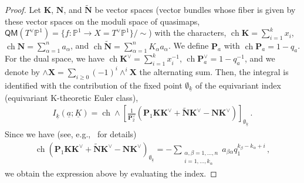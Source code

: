 \begin{proof}
    Let $\mathbf{K}$, $\mathbf{N}$, and $\widetilde{\mathbf{N}}$ be vector spaces (vector bundles whose fiber is given by these vector spaces on the moduli space of quasimaps, $\mathsf{QM}(T^\vee\mathbb{P}^1) = \{f : \mathbb{P}^1 \to X = T^\vee\mathbb{P}^1\}/\sim$) with the characters, $\operatorname{ch} \mathbf{K} = \sum_{i=1}^k x_i$, $\operatorname{ch} \mathbf{N} = \sum_{\alpha=1}^n a_\alpha$, and $\operatorname{ch} \widetilde{\mathbf{N}} = \sum_{\alpha=1}^n K_\alpha a_\alpha$.
    We define $\mathbf{P}_a$ with $\operatorname{ch} \mathbf{P}_a = 1 - q_a$.
    For the dual space, we have $\operatorname{ch} \mathbf{K}^\vee = \sum_{i=1}^k x_i^{-1}$, $\operatorname{ch} \mathbf{P}_a^\vee = 1 - q_a^{-1}$, and we denote by $\wedge \mathbf{X} = \sum_{i \ge 0} (-1)^i \wedge^i \mathbf{X}$ the alternating sum.
    Then, the integral is identified with the contribution of the fixed point $\emptyset_{\underline{k}}$ of the equivariant index (equivariant K-theoretic Euler class),
    \begin{align}
    I_{\underline{k}} (\underline{a};\underline{K}) = \operatorname{ch} \wedge \left[ \frac{1}{\mathbf{P}_2^\vee} \left( \mathbf{P}_1 \mathbf{K} \mathbf{K}^\vee + \widetilde{\mathbf{N}} \mathbf{K}^\vee - \mathbf{N} \mathbf{K}^\vee \right) \right]_{\emptyset_{\underline{k}}} \, .
    \end{align}    
    Since we have (see, e.g.,~\cite{Shadchin:2006yz} for details)
    \begin{align}
        \operatorname{ch} \left( \mathbf{P}_1 \mathbf{K} \mathbf{K}^\vee + \widetilde{\mathbf{N}} \mathbf{K}^\vee - \mathbf{N} \mathbf{K}^\vee \right)_{\emptyset_{\underline{k}}} = - \sum_{\substack{\alpha,\beta = 1, \ldots, n \\ i = 1, \ldots, k_\alpha}} a_{\beta \alpha} q_1^{k_\beta - k_\alpha + i} \, ,
    \end{align}
    we obtain the expression above by evaluating the index.
\end{proof}

